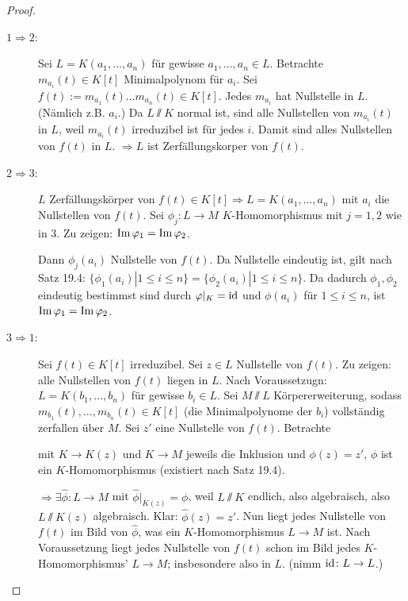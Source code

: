 \documentclass[12pt,a4paper]{scrartcl}
\begin{document}
\begin{proof}
	\leavevmode
	\begin{description}
		\item[$1\Rightarrow2$:] Sei $L = K(a_1,\dots,a_n)$ für gewisse $a_1,\dots,a_n\in L$. Betrachte $m_{a_i}(t)\in K[t]$ Minimalpolynom für $a_i$. Sei $f(t):=m_{a_1}(t)\dots m_{a_n}(t)\in K[t]$. Jedes $m_{a_i}$ hat Nullstelle in $L$. (Nämlich z.B. $a_i$.) Da $L\sslash K$ normal ist, sind alle Nullstellen von $m_{a_i}(t)$ in $L$, weil $m_{a_i}(t)$ irreduzibel ist für jedes $i$. Damit sind alles Nullstellen von $f(t)$ in $L$. $\Rightarrow L$ ist Zerfällungskorper von $f(t)$.
		\item[$2\Rightarrow3$:] $L$ Zerfällungskörper von $f(t)\in K[t]\Rightarrow L = K(a_1,\dots, a_n)$ mit $a_i$ die Nullstellen von $f(t)$. Sei $\phi_j\colon L\to M$ $K$-Homomorphismus mit $j = 1,2$ wie in $3$. Zu zeigen: $\operatorname{Im} \varphi_1 = \operatorname{Im}\varphi_2$.
		
		Dann $\phi_j(a_i)$ Nullstelle von $f(t)$. Da Nullstelle eindeutig ist, gilt nach Satz 19.4: $\{\phi_1(a_i)|1\leq i\leq n\} = \{\phi_2(a_i)|1\leq i\leq n\}$. Da dadurch $\phi_1, \phi_2$ eindeutig bestimmst sind durch $\varphi|_K = \operatorname{id}$ und $\phi(a_i)$ für $1\leq i\leq n$, ist $\operatorname{Im}\varphi_1 = \operatorname{Im}\varphi_2$.
		\item[$3\Rightarrow 1$:] Sei $f(t)\in K[t]$ irreduzibel. Sei $z\in L$ Nullstelle von $f(t)$. Zu zeigen: alle Nullstellen von $f(t)$ liegen in $L$. Nach Voraussetzugn: $L = K(b_1,\dots, b_n)$ für gewisse $b_i\in L$. Sei $M\sslash L$ Körpererweiterung, sodass $m_{b_1}(t),\dots , m_{b_n}(t)\in K[t]$ (die Minimalpolynome der $b_i$) vollständig zerfallen über $M$. Sei $z'$ eine Nullstelle von $f(t)$. Betrachte
		\begin{center}
		\end{center}
		mit $K\to K(z)$ und $K\to M$ jeweils die Inklusion und $\phi(z) = z'$, $\phi$ ist ein $K$-Homomorphismus (existiert nach Satz 19.4).
		
		$\Rightarrow \exists \hat{\phi}\colon L\to M$ mit $\hat{\phi}|_{K(z)} = \phi$, weil $L\sslash K$ endlich, also algebraisch, also $L\sslash K(z)$ algebraisch. Klar: $\hat{\phi}(z) = z'$. Nun liegt jedes Nullstelle von $f(t)$ im Bild von $\hat{\phi}$, was ein $K$-Homomorphismus $L\to M$ ist. Nach Voraussetzung liegt jedes Nullstelle von $f(t)$ schon im Bild jedes $K$-Homomorphismus' $L\to M$; insbesondere also in $L$. (nimm $\operatorname{id}\colon L\to L$.)
	\end{description}
\end{proof}
\end{document}
